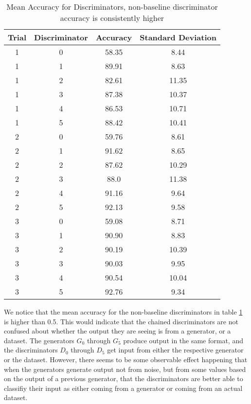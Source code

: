 \documentclass[conference]{IEEEtran}
\begin{document}
\begin{table}[htpb]
\begin{center}
\begin{tabular}{|c|c|c|c|}
  \hline
  Trial & Discriminator & Accuracy & Standard Deviation  \\\hline
  1 & 0 & 58.35 & 8.44    \\\hline
  1 & 1 & 89.91 & 8.63   \\\hline
  1 & 2 & 82.61 & 11.35   \\\hline
  1 & 3 & 87.38 & 10.37  \\\hline
  1 & 4 & 86.53 & 10.71   \\\hline
  1 & 5 & 88.42 & 10.41    \\\hline
  2 & 0 & 59.76 & 8.61    \\\hline
  2 & 1 & 91.62 & 8.65   \\\hline
  2 & 2 & 87.62 & 10.29   \\\hline
  2 & 3 & 88.0 & 11.38  \\\hline
  2 & 4 & 91.16 & 9.64   \\\hline
  2 & 5 & 92.13 & 9.58    \\\hline
  3 & 0 & 59.08 & 8.71    \\\hline
  3 & 1 & 90.90 & 8.83   \\\hline
  3 & 2 & 90.19 & 10.39   \\\hline
  3 & 3 & 90.03 & 9.95  \\\hline
  3 & 4 & 90.54 & 10.04   \\\hline
  3 & 5 & 92.76 & 9.34    \\\hline

  \end{tabular}
\caption{Mean Accuracy for Discriminators, non-baseline discriminator accuracy
is consistently higher}
\label{discTab}
\end{center}
\end{table}

We notice that the mean accuracy for the non-baseline discriminators  in table
\ref{discTab} is higher than 0.5.   This would indicate that the chained
discriminators are not confused about whether the output they are seeing is from
a generator, or a dataset.  The generators $G_{0}$ through $G_{5}$  produce
output in the same format, and the discriminators $D_{0}$ through $D_{5}$ get
input from either the respective generator or the dataset.  However, there seems
to be some observable effect happening that when the generators generate output
not from noise, but from some values based on the output of a previous
generator, that the discriminators are better able to classifiy their input as
either coming from a generator or coming from an actual dataset.
\end{document}
